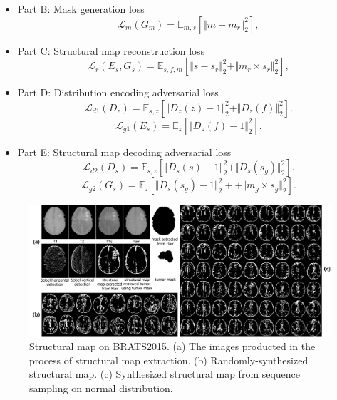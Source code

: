 \documentclass[runningheads]{llncs}
\begin{document}
	\begin{itemize}
		\item{Part B: Mask generation loss}
		\begin{equation}
		\mathcal{L}_{m}(G_m)=\mathbb{E}_{m,s}[\Vert{m-m_r}\Vert_{2}^{2}],
		\end{equation}
		\item{Part C: Structural map reconstruction loss} 
		\begin{equation}
		\mathcal{L}_{r}(E_s,G_s)=\mathbb{E}_{s,f,m}[\Vert{s-s_r}\Vert_{2}^{2}+\Vert{m_r\times s_r}\Vert_{2}^{2}],
		\end{equation}
		\item{Part D: Distribution encoding adversarial loss} 
		\begin{equation}
		\mathcal{L}_{d1}(D_{z})=\mathbb{E}_{s,z}[\Vert{D_{z}(z)-1}\Vert_{2}^{2}+\Vert{D_{z}(f)}\Vert_{2}^{2}].
		\end{equation}
		\begin{equation}
		\mathcal{L}_{g1}(E_s)=\mathbb{E}_{z}[\Vert{D_{z}(f)-1}\Vert_{2}^{2}].	
		\end{equation}
		\item{Part E: Structural map decoding adversarial loss} 
		\begin{equation}
		\mathcal{L}_{d2}(D_{s})=\mathbb{E}_{s,z}[\Vert{D_{s}(s)-1}\Vert_{2}^{2}+\Vert{D_{s}(s_g)}\Vert_{2}^{2}].
		\end{equation}
		\begin{equation}
		\mathcal{L}_{g2}(G_s)=\mathbb{E}_{z}[\Vert{D_{s}(s_g)-1}\Vert_{2}^{2}++\Vert{m_g\times s_g}\Vert_{2}^{2}].	
		\end{equation}
	\end{itemize}
	\begin{figure}[th]
		\centering
		\includegraphics[width=1\linewidth]{figures/brats_f}
		\caption{Structural map on BRATS2015. (a) The images producted in the process of structural map extraction. (b) Randomly-synthesized structural map. (c) Synthesized structural map from sequence sampling on normal distribution.}
		\label{generated_f}
	\end{figure}
\end{document}
